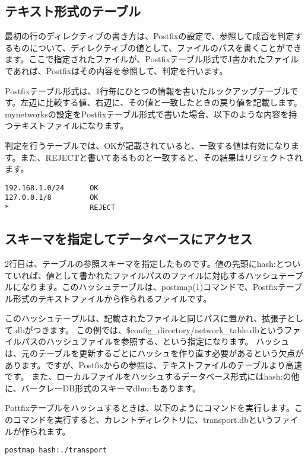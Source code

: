 \subsection{テキスト形式のテーブル}

最初の行のディレクティブの書き方は、Postfixの設定で、参照して成否を判定するものについて、ディレクティブの値として、ファイルのパスを書くことができます。ここで指定されたファイルが、Postfixテーブル形式でJ書かれたファイルであれば、Postfixはその内容を参照して、判定を行います。

Postfixテーブル形式は、1行毎にひとつの情報を書いたルックアップテーブルです。左辺に比較する値、右辺に、その値と一致したときの戻り値を記載します。mynetworksの設定をPostfixテーブル形式で書いた場合、以下のような内容を持つテキストファイルになります。

判定を行うテーブルでは、OKが記載されていると、一致する値は有効になります。また、REJECTと書いてあるものと一致すると、その結果はリジェクトされます。

\begin{lstlisting}[basicstyle=\ttfamily\footnotesize, frame=single]
192.168.1.0/24      OK
127.0.0.1/8         OK
*                   REJECT
\end{lstlisting}

\subsection{スキーマを指定してデータベースにアクセス}

2行目は、テーブルの参照スキーマを指定したものです。値の先頭にhash:とついていれば、値として書かれたファイルパスのファイルに対応するハッシュテーブルになります。このハッシュテーブルは、postmap(1)コマンドで、Postfixテーブル形式のテキストファイルから作られるファイルです。

このハッシュテーブルは、記載されたファイルと同じパスに置かれ、拡張子として.dbがつきます。
この例では、\$config\_directory/network\_table.dbというファイルパスのハッシュファイルを参照する、という指定になります。
ハッシュは、元のテーブルを更新するごとにハッシュを作り直す必要があるという欠点があります。ですが、Postfixからの参照は、テキストファイルのテーブルより高速です。
また、ローカルファイルをハッシュするデータベース形式にはhash:の他に、バークレーDB形式のスキーマdbm:もあります。

Pottfixテーブルをハッシュするときは、以下のようにコマンドを実行します。このコマンドを実行すると、カレントディレクトリに、transport.dbというファイルが作られます。

\begin{verbatim}
postmap hash:./transport
\end{verbatim}

